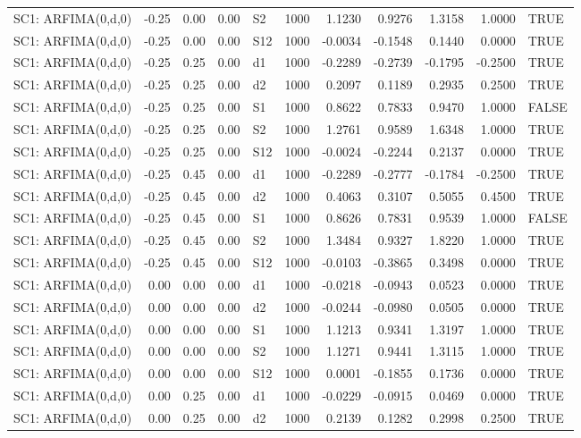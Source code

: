 \begin{table}[ht]
\begin{tabular}{lrrrlrrrrrl}
  SC1: ARFIMA(0,d,0) & -0.25 & 0.00 & 0.00 & S2 & 1000 & 1.1230 & 0.9276 & 1.3158 & 1.0000 & TRUE \\ 
  SC1: ARFIMA(0,d,0) & -0.25 & 0.00 & 0.00 & S12 & 1000 & -0.0034 & -0.1548 & 0.1440 & 0.0000 & TRUE \\ 
  SC1: ARFIMA(0,d,0) & -0.25 & 0.25 & 0.00 & d1 & 1000 & -0.2289 & -0.2739 & -0.1795 & -0.2500 & TRUE \\ 
  SC1: ARFIMA(0,d,0) & -0.25 & 0.25 & 0.00 & d2 & 1000 & 0.2097 & 0.1189 & 0.2935 & 0.2500 & TRUE \\ 
  SC1: ARFIMA(0,d,0) & -0.25 & 0.25 & 0.00 & S1 & 1000 & 0.8622 & 0.7833 & 0.9470 & 1.0000 & FALSE \\ 
  SC1: ARFIMA(0,d,0) & -0.25 & 0.25 & 0.00 & S2 & 1000 & 1.2761 & 0.9589 & 1.6348 & 1.0000 & TRUE \\ 
  SC1: ARFIMA(0,d,0) & -0.25 & 0.25 & 0.00 & S12 & 1000 & -0.0024 & -0.2244 & 0.2137 & 0.0000 & TRUE \\ 
  SC1: ARFIMA(0,d,0) & -0.25 & 0.45 & 0.00 & d1 & 1000 & -0.2289 & -0.2777 & -0.1784 & -0.2500 & TRUE \\ 
  SC1: ARFIMA(0,d,0) & -0.25 & 0.45 & 0.00 & d2 & 1000 & 0.4063 & 0.3107 & 0.5055 & 0.4500 & TRUE \\ 
  SC1: ARFIMA(0,d,0) & -0.25 & 0.45 & 0.00 & S1 & 1000 & 0.8626 & 0.7831 & 0.9539 & 1.0000 & FALSE \\ 
  SC1: ARFIMA(0,d,0) & -0.25 & 0.45 & 0.00 & S2 & 1000 & 1.3484 & 0.9327 & 1.8220 & 1.0000 & TRUE \\ 
  SC1: ARFIMA(0,d,0) & -0.25 & 0.45 & 0.00 & S12 & 1000 & -0.0103 & -0.3865 & 0.3498 & 0.0000 & TRUE \\ 
  SC1: ARFIMA(0,d,0) & 0.00 & 0.00 & 0.00 & d1 & 1000 & -0.0218 & -0.0943 & 0.0523 & 0.0000 & TRUE \\ 
  SC1: ARFIMA(0,d,0) & 0.00 & 0.00 & 0.00 & d2 & 1000 & -0.0244 & -0.0980 & 0.0505 & 0.0000 & TRUE \\ 
  SC1: ARFIMA(0,d,0) & 0.00 & 0.00 & 0.00 & S1 & 1000 & 1.1213 & 0.9341 & 1.3197 & 1.0000 & TRUE \\ 
  SC1: ARFIMA(0,d,0) & 0.00 & 0.00 & 0.00 & S2 & 1000 & 1.1271 & 0.9441 & 1.3115 & 1.0000 & TRUE \\ 
  SC1: ARFIMA(0,d,0) & 0.00 & 0.00 & 0.00 & S12 & 1000 & 0.0001 & -0.1855 & 0.1736 & 0.0000 & TRUE \\ 
  SC1: ARFIMA(0,d,0) & 0.00 & 0.25 & 0.00 & d1 & 1000 & -0.0229 & -0.0915 & 0.0469 & 0.0000 & TRUE \\ 
  SC1: ARFIMA(0,d,0) & 0.00 & 0.25 & 0.00 & d2 & 1000 & 0.2139 & 0.1282 & 0.2998 & 0.2500 & TRUE \\ 

\end{tabular}
\end{table}
